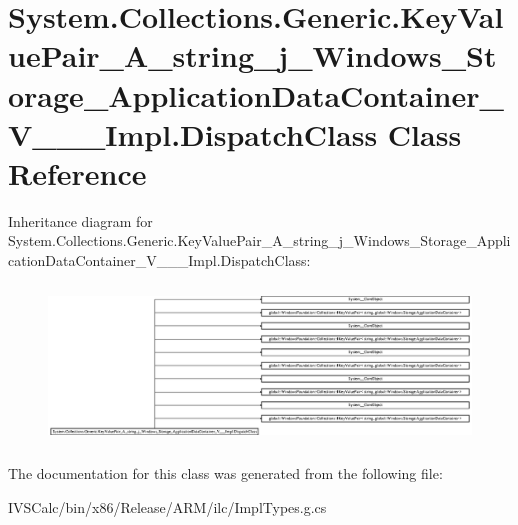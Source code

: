 \hypertarget{class_system_1_1_collections_1_1_generic_1_1_key_value_pair___a__string__j___windows___storage__006d395f87caef9aa235c1ca450798be}{}\section{System.\+Collections.\+Generic.\+Key\+Value\+Pair\+\_\+\+A\+\_\+string\+\_\+j\+\_\+\+Windows\+\_\+\+Storage\+\_\+\+Application\+Data\+Container\+\_\+\+V\+\_\+\+\_\+\+\_\+\+Impl.\+Dispatch\+Class Class Reference}
\label{class_system_1_1_collections_1_1_generic_1_1_key_value_pair___a__string__j___windows___storage__006d395f87caef9aa235c1ca450798be}
Inheritance diagram for System.\+Collections.\+Generic.\+Key\+Value\+Pair\+\_\+\+A\+\_\+string\+\_\+j\+\_\+\+Windows\+\_\+\+Storage\+\_\+\+Application\+Data\+Container\+\_\+\+V\+\_\+\+\_\+\+\_\+\+Impl.\+Dispatch\+Class\+:\begin{figure}[H]
\begin{center}
\leavevmode
\includegraphics[height=4.260027cm]{class_system_1_1_collections_1_1_generic_1_1_key_value_pair___a__string__j___windows___storage__006d395f87caef9aa235c1ca450798be}
\end{center}
\end{figure}


The documentation for this class was generated from the following file\+:\begin{DoxyCompactItemize}
\item 
I\+V\+S\+Calc/bin/x86/\+Release/\+A\+R\+M/ilc/Impl\+Types.\+g.\+cs\end{DoxyCompactItemize}
